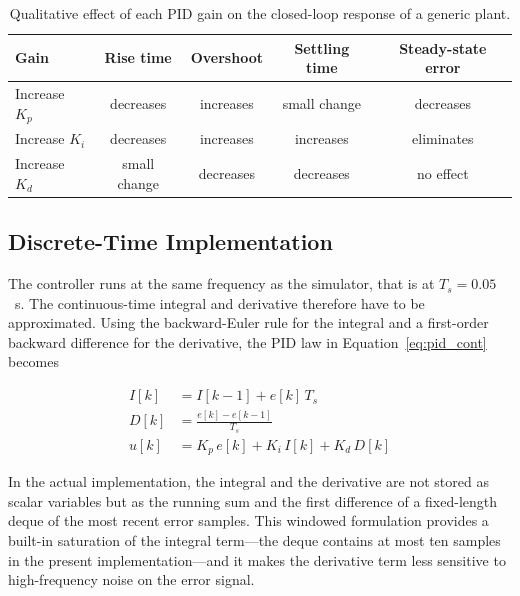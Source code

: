 \begin{table}[htbp]
    \centering
    \footnotesize
    \begin{tabular}{@{} l cccc @{}}
        \toprule
        \textbf{Gain} & \textbf{Rise time} & \textbf{Overshoot} & \textbf{Settling time} & \textbf{Steady-state error} \\
        \midrule
        Increase $K_p$ & decreases    & increases & small change & decreases   \\
        \addlinespace
        Increase $K_i$ & decreases    & increases & increases    & eliminates  \\
        \addlinespace
        Increase $K_d$ & small change & decreases & decreases    & no effect   \\
        \bottomrule
    \end{tabular}
    \caption{Qualitative effect of each PID gain on the closed-loop response of a generic plant.}
    \label{tab:pid_effects}
\end{table}

\subsection{Discrete-Time Implementation}
The controller runs at the same frequency as the simulator, that is at $T_s = 0.05$~s. The continuous-time integral and derivative therefore have to be approximated. Using the backward-Euler rule for the integral and a first-order backward difference for the derivative, the PID law in Equation~\eqref{eq:pid_cont} becomes

\begin{align}
    I[k] &= I[k-1] + e[k]\, T_s \label{eq:pid_int} \\
    D[k] &= \frac{e[k] - e[k-1]}{T_s} \label{eq:pid_der} \\
    u[k] &= K_p\, e[k] + K_i\, I[k] + K_d\, D[k] \label{eq:pid_disc}
\end{align}

In the actual implementation, the integral and the derivative are not stored as scalar variables but as the running sum and the first difference of a fixed-length deque of the most recent error samples. This windowed formulation provides a built-in saturation of the integral term---the deque contains at most ten samples in the present implementation---and it makes the derivative term less sensitive to high-frequency noise on the error signal.
 
